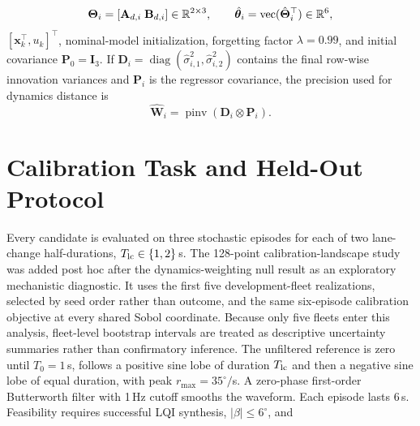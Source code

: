 \documentclass[11pt]{article}
\begin{document}
\begin{equation}
 \boldsymbol{\Theta}_i=[\mathbf A_{d,i}\;\mathbf B_{d,i}]\in\mathbb R^{2\times3},
 \qquad
 \textcolor{JWgreen}{\hat{\boldsymbol{\theta}}_i=\operatorname{vec}(\hat{\boldsymbol{\Theta}}_i^\top)\in\mathbb R^6},
\end{equation}
 $[\mathbf x_k^\top,u_k]^\top$, nominal-model initialization, forgetting factor $\lambda=0.99$, and initial covariance $\mathbf P_0=\mathbf I_3$.  If $\mathbf D_i=\operatorname{diag}(\hat\sigma_{i,1}^2,\hat\sigma_{i,2}^2)$ contains the final row-wise innovation variances and $\mathbf P_i$ is the regressor covariance, the precision used for dynamics distance is
\begin{equation}
 \hat{\mathbf W}_i=\operatorname{pinv}\!\left(\mathbf D_i\otimes\mathbf P_i\right).
\end{equation}

\section{Calibration Task and Held-Out Protocol}

Every candidate is evaluated on three stochastic episodes for each of two lane-change half-durations, $T_{\rm lc}\in\{1,2\}$\,s.  The 128-point calibration-landscape study was added post hoc after the dynamics-weighting null result as an exploratory mechanistic diagnostic. It uses the first five development-fleet realizations, selected by seed order rather than outcome, and the same six-episode calibration objective at every shared Sobol coordinate. Because only five fleets enter this analysis, fleet-level bootstrap intervals are treated as descriptive uncertainty summaries rather than confirmatory inference.  The unfiltered reference is zero until $T_0=1$\,s, follows a positive sine lobe of duration $T_{\rm lc}$ and then a negative sine lobe of equal duration, with peak $r_{\max}=35^\circ/$s. A zero-phase first-order Butterworth filter with 1\,Hz cutoff smooths the waveform. Each episode lasts 6\,s. Feasibility requires successful LQI synthesis, $|\beta|\le6^\circ$, and  
\end{document}
